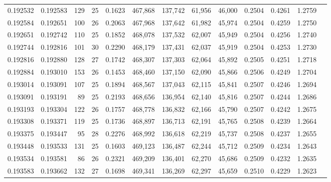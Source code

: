 \begin{tabular}{rrrrrrrrrrrrr}
0.192532 & 0.192583 & 129 &  25 &                                     0.1623 & 467,868 & 137,742 &  61,956 &  46,000 & 0.2504 & 0.4261 & 1.2759 \\
0.192584 & 0.192651 & 100 &  26 &                                     0.2063 & 467,968 & 137,642 &  61,982 &  45,974 & 0.2504 & 0.4259 & 1.2750 \\
0.192651 & 0.192742 & 110 &  25 &                                     0.1852 & 468,078 & 137,532 &  62,007 &  45,949 & 0.2504 & 0.4256 & 1.2740 \\
0.192744 & 0.192816 & 101 &  30 &                                     0.2290 & 468,179 & 137,431 &  62,037 &  45,919 & 0.2504 & 0.4253 & 1.2730 \\
0.192816 & 0.192880 & 128 &  27 &                                     0.1742 & 468,307 & 137,303 &  62,064 &  45,892 & 0.2505 & 0.4251 & 1.2718 \\
0.192884 & 0.193010 & 153 &  26 &                                     0.1453 & 468,460 & 137,150 &  62,090 &  45,866 & 0.2506 & 0.4249 & 1.2704 \\
0.193014 & 0.193091 & 107 &  25 &                                     0.1894 & 468,567 & 137,043 &  62,115 &  45,841 & 0.2507 & 0.4246 & 1.2694 \\
0.193091 & 0.193191 &  89 &  25 &                                     0.2193 & 468,656 & 136,954 &  62,140 &  45,816 & 0.2507 & 0.4244 & 1.2686 \\
0.193193 & 0.193304 & 122 &  26 &                                     0.1757 & 468,778 & 136,832 &  62,166 &  45,790 & 0.2507 & 0.4242 & 1.2675 \\
0.193308 & 0.193371 & 119 &  25 &                                     0.1736 & 468,897 & 136,713 &  62,191 &  45,765 & 0.2508 & 0.4239 & 1.2664 \\
0.193375 & 0.193447 &  95 &  28 &                                     0.2276 & 468,992 & 136,618 &  62,219 &  45,737 & 0.2508 & 0.4237 & 1.2655 \\
0.193448 & 0.193533 & 131 &  25 &                                     0.1603 & 469,123 & 136,487 &  62,244 &  45,712 & 0.2509 & 0.4234 & 1.2643 \\
0.193534 & 0.193581 &  86 &  26 &                                     0.2321 & 469,209 & 136,401 &  62,270 &  45,686 & 0.2509 & 0.4232 & 1.2635 \\
0.193583 & 0.193662 & 132 &  27 &                                     0.1698 & 469,341 & 136,269 &  62,297 &  45,659 & 0.2510 & 0.4229 & 1.2623 \\

\end{tabular}
